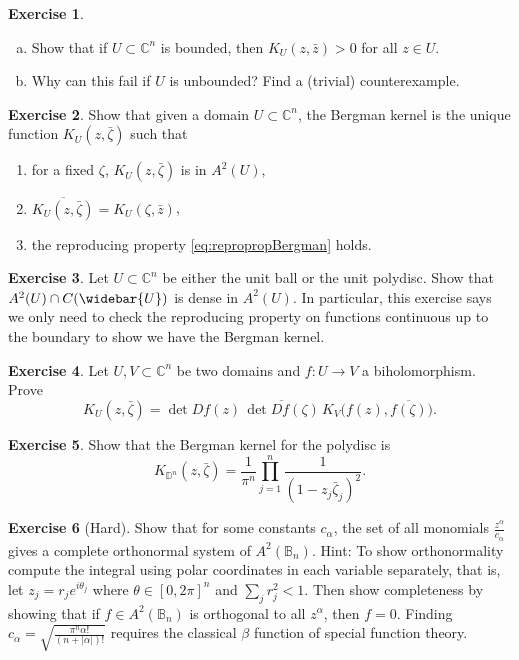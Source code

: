 \documentclass[12pt,openany]{book}
\newcommand{\abs}[1]{\left\lvert {#1} \right\rvert}
\newcommand{\C}{{\mathbb{C}}}
\newcommand{\D}{{\mathbb{D}}}
\newcommand{\bB}{{\mathbb{B}}}
\theoremstyle{plain}
\theoremstyle{remark}
\theoremstyle{definition}
\newenvironment{exbox}{%
    \def\FrameCommand{\vrule width 1pt \relax\hspace{10pt}}%
    \MakeFramed {\advance \hsize -\width \FrameRestore}%
}{%
    \endMakeFramed
}
\newenvironment{exparts}{%
    \leavevmode\begin{enumerate}[a),noitemsep,topsep=0pt,parsep=0pt,partopsep=0pt]
}{%
    \end{enumerate}
}
\newenvironment{exnumparts}{%
    \leavevmode\begin{enumerate}[1),noitemsep,topsep=0pt,parsep=0pt,partopsep=0pt]
}{%
    \end{enumerate}
}
\theoremstyle{exercise}
\newtheorem{exercise}{Exercise}[section]
\theoremstyle{example}
\begin{document}
\begin{exbox}
\begin{exercise}
\begin{exparts}
\item
Show that if $U \subset \C^n$ is bounded, then
$K_U(z,\bar{z}) > 0$
for all $z \in U$.
\item
Why can this fail if $U$ is unbounded?
Find a (trivial) counterexample.
\end{exparts}
\end{exercise}

\begin{exercise}
Show that given a domain $U \subset \C^n$, the Bergman kernel is the unique
function $K_U(z,\bar{\zeta})$ such that
\begin{exnumparts}
\item
for a fixed $\zeta$, $K_U(z,\bar{\zeta})$ is in $A^2(U)$,
\item
$\overline{K_U(z,\bar{\zeta})} =
K_U(\zeta,\bar{z})$,
\item
the reproducing property \eqref{eq:repropropBergman}
holds.
\end{exnumparts}
\end{exercise}

\begin{exercise}
Let $U \subset \C^n$ be either the unit ball or the unit polydisc.
Show that 
$A^2(U) \cap C(\widebar{U})$ is dense in $A^2(U)$.  In particular, this
exercise says we
only need to check the reproducing property on functions continuous up to
the boundary to show we have the Bergman kernel.
\end{exercise}

\begin{exercise}
Let $U, V \subset \C^n$ be two domains and $f \colon U \to V$ a
biholomorphism.  Prove
\begin{equation*}
K_U(z,\bar{\zeta}) = \det D f(z) \, \overline{\det D f (\zeta)} \,
K_V\bigl(f(z),\overline{f(\zeta)}\bigr) .
\end{equation*}
\end{exercise}

\begin{exercise}
Show that the Bergman kernel for the polydisc is
\begin{equation*}
K_{\D^n}(z,\bar{\zeta}) =
\frac{1}{\pi^n} \prod_{j=1}^n \frac{1}{{(1-z_j\bar{\zeta}_j)}^2}.
\end{equation*}
\end{exercise}

\begin{exercise}[Hard]
Show that for
some constants $c_\alpha$,
the set of all monomials $\frac{z^\alpha}{c_\alpha}$ gives a complete orthonormal
system of $A^2(\bB_n)$.  Hint: To show orthonormality
compute the integral using polar coordinates in each variable
separately, that is, let $z_j = r_j e^{i\theta_j}$ where $\theta \in
[0,2\pi]^n$ and $\sum_j r_j^2 < 1$.  Then show completeness by showing that
if $f \in A^2(\bB_n)$ is orthogonal to all $z^\alpha$, then $f = 0$.
Finding $c_\alpha = \sqrt{\frac{\pi^n \alpha!}{(n+\abs{\alpha})!}}$ requires
the classical $\beta$ function of special function theory.
\end{exercise}


\end{exbox}
\end{document}
